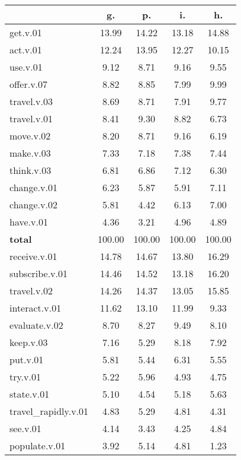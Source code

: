 \begin{table}[h!]
\begin{center}
\begin{tabular}{| l || c | c | c | c |}\hline
 & {\bf g.} & {\bf p.} & {\bf i.} & {\bf h.} \\\hline\hline
get.v.01 & 13.99  & 14.22  & 13.18  & 14.88 \\\hline
act.v.01 & 12.24  & 13.95  & 12.27  & 10.15 \\\hline
use.v.01 & 9.12  & 8.71  & 9.16  & 9.55 \\\hline
offer.v.07 & 8.82  & 8.85  & 7.99  & 9.99 \\\hline
travel.v.03 & 8.69  & 8.71  & 7.91  & 9.77 \\\hline
travel.v.01 & 8.41  & 9.30  & 8.82  & 6.73 \\\hline
move.v.02 & 8.20  & 8.71  & 9.16  & 6.19 \\\hline
make.v.03 & 7.33  & 7.18  & 7.38  & 7.44 \\\hline
think.v.03 & 6.81  & 6.86  & 7.12  & 6.30 \\\hline
change.v.01 & 6.23  & 5.87  & 5.91  & 7.11 \\\hline
change.v.02 & 5.81  & 4.42  & 6.13  & 7.00 \\\hline
have.v.01 & 4.36  & 3.21  & 4.96  & 4.89 \\\hline\hline
{{\bf total}} & 100.00  & 100.00  & 100.00  & 100.00 \\\hline\hline\hline
receive.v.01 & 14.78  & 14.67  & 13.80  & 16.29 \\\hline
subscribe.v.01 & 14.46  & 14.52  & 13.18  & 16.20 \\\hline
travel.v.02 & 14.26  & 14.37  & 13.05  & 15.85 \\\hline
interact.v.01 & 11.62  & 13.10  & 11.99  & 9.33 \\\hline
evaluate.v.02 & 8.70  & 8.27  & 9.49  & 8.10 \\\hline
keep.v.03 & 7.16  & 5.29  & 8.18  & 7.92 \\\hline
put.v.01 & 5.81  & 5.44  & 6.31  & 5.55 \\\hline
try.v.01 & 5.22  & 5.96  & 4.93  & 4.75 \\\hline
state.v.01 & 5.10  & 4.54  & 5.18  & 5.63 \\\hline
travel\_rapidly.v.01 & 4.83  & 5.29  & 4.81  & 4.31 \\\hline
see.v.01 & 4.14  & 3.43  & 4.25  & 4.84 \\\hline
populate.v.01 & 3.92  & 5.14  & 4.81  & 1.23 \\\hline\hline

\end{tabular}
\end{center}
\end{table}
